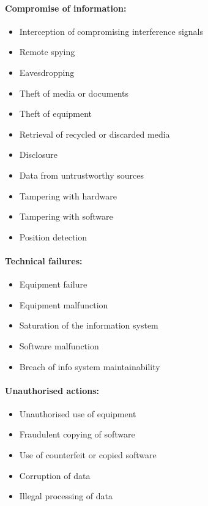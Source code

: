 \documentclass[10pt,a4paper]{article}
\begin{document}
\begin{multicols}{2}
\paragraph*{Compromise of information:}
\begin{itemize}[noitemsep,topsep=0pt,leftmargin=*]
    \item Interception of compromising
    interference signals
    \item Remote spying
    \item Eavesdropping
    \item Theft of media or documents
    \item Theft of equipment
    \item Retrieval of recycled or discarded media
    \item Disclosure
    \item Data from untrustworthy sources
    \item Tampering with hardware
    \item Tampering with software
    \item Position detection
\end{itemize}

\paragraph*{Technical failures:}
\begin{itemize}[noitemsep,topsep=0pt,leftmargin=*]
    \item Equipment failure
    \item Equipment malfunction
    \item Saturation of the information system
    \item Software malfunction
    \item Breach of info system maintainability
\end{itemize}

\paragraph*{Unauthorised actions:}
\begin{itemize}[noitemsep,topsep=0pt,leftmargin=*]
    \item Unauthorised use of equipment
    \item Fraudulent copying of software
    \item Use of counterfeit or copied software
    \item Corruption of data
    \item Illegal processing of data
\end{itemize}


\end{multicols}
\end{document}
